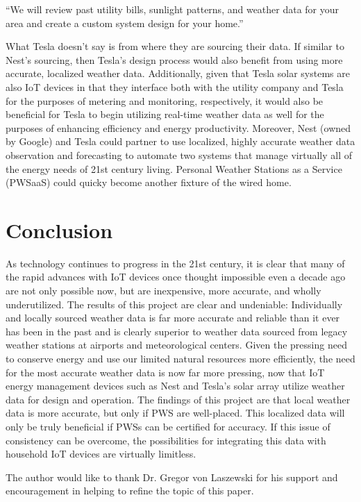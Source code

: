 \documentclass[sigconf]{acmart}
\begin{document}
``We will review past utility bills, sunlight patterns, and weather data for your area and create a custom system design for your home.''

What Tesla doesn't say is from where they are sourcing their data. If similar to Nest's sourcing, then Tesla's design process would also benefit from using more accurate, localized weather data. Additionally, given that Tesla solar systems are also IoT devices in that they interface both with the utility company and Tesla for the purposes of metering and monitoring, respectively, it would also be beneficial for Tesla to begin utilizing real-time weather data as well for the purposes of enhancing efficiency and energy productivity. Moreover, Nest (owned by Google) and Tesla could partner to use localized, highly accurate weather data observation and forecasting to automate two systems that manage virtually all of the energy needs of 21st century living. Personal Weather Stations as a Service (PWSaaS) could quicky become another fixture of the wired home.

\section{Conclusion}

As technology continues to progress in the 21st century, it is clear that many of the rapid advances with IoT devices once thought impossible even a decade ago are not only possible now, but are inexpensive, more accurate, and wholly underutilized. The results of this project are clear and undeniable: Individually and locally sourced weather data is far more accurate and reliable than it ever has been in the past and is clearly superior to weather data sourced from legacy weather stations at airports and meteorological centers. Given the pressing need to conserve energy and use our limited natural resources more efficiently, the need for the most accurate weather data is now far more pressing, now that IoT energy management devices such as Nest and Tesla's solar array utilize weather data for design and operation. The findings of this project are that local weather data is more accurate, but only if PWS are well-placed. This localized data will only be truly beneficial if PWSs can be certified for accuracy. If this issue of consistency can be overcome, the possibilities for integrating this data with household IoT devices are virtually limitless.

\begin{acks}

The author would like to thank Dr. Gregor von Laszewski for his support and encouragement in helping to refine the topic of this paper.

\end{acks}


 
\end{document}
